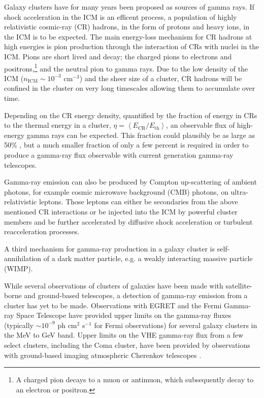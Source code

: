 \documentclass[12pt,manuscript]{aastex}
\newcommand{\expval}[1]{\left\langle #1 \right\rangle}
\begin{document}
Galaxy clusters have for many years been proposed as sources of gamma rays. If shock acceleration in the ICM is an efficent process, a population of highly relativistic cosmic-ray (CR) hadrons, in the form of protons and heavy ions, in the ICM is to be expected. The main energy-loss mechanism for CR hadrons at high energies is pion production through the interaction of CRs with nuclei in the ICM. Pions are short lived and decay; the charged pions to electrons and positrons,\footnote{A charged pion decays to a muon or antimuon, which subsequently decay to an electron or positron.} and the neutral pion to gamma rays. Due to the low density of the ICM ($n_{\mathrm{ICM}}\sim 10^{-3}$ cm$^{-3}$) and the sheer size of a cluster, CR hadrons will be confined in the cluster on very long timescales \citep[][]{article:Volk_etal:1996, article:Berezinsky_etal:1997} allowing them to accumulate over time. 

Depending on the CR energy density, quantified by the fraction of energy in CRs to the thermal energy in a cluster, $\eta=\expval{ E_{\mathrm{CR}}/E_{\mathrm{th}}}$, an observable flux of high-energy gamma rays can be expected. This fraction could plausibly be as large as 50\% \citep{article:Ryu_etal:2003}, but a much smaller fraction of only a few percent is required in order to produce a gamma-ray flux observable with current generation gamma-ray telescopes. 

Gamma-ray emission can also be produced by Compton up-scattering of ambient photons, for example cosmic microwave background (CMB) photons, on ultra-relativistic leptons. Those leptons can either be secondaries from the above mentioned CR interactions or be injected into the ICM by powerful cluster members and be further accelerated by diffusive shock acceleration or turbulent reacceleration processes.

A third mechanism for gamma-ray production in a galaxy cluster is self-annihilation of a dark matter particle, e.g. a weakly interacting massive particle (WIMP). 

While several observations of clusters of galaxies have been made with satellite-borne and ground-based telescopes, a detection of gamma-ray emission from a cluster has yet to be made.  Observations with EGRET \citep{article:Sreekumar_etal:1996, article:Reimer_etal:2003} and the Fermi Gamma-ray Space Telescope \citep{article:Ackermann_etal:2010} have provided upper limits on the gamma-ray fluxes (typically $\sim10^{-9}$ ph cm$^{2}$ s$^{-1}$ for Fermi observations) for several galaxy clusters in the MeV to GeV band. Upper limits on the VHE gamma-ray flux from a few select clusters, including the Coma cluster, have been provided by observations with ground-based imaging atmospheric Cherenkov telescopes \citep[IACTs;][]{article:Perkins_etal:2006, inproc:Perkins_etal:2008, article:Aharonian_etal:2009, article:Aleksic_etal:2010}.
\end{document}
